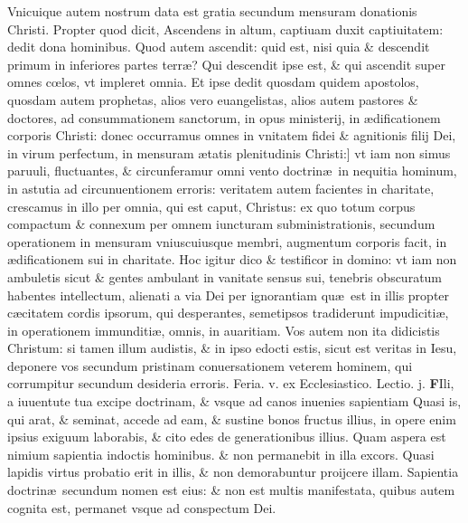 \documentclass[a5paper,10pt]{book}
\def\leftmarginnote{%
	\lrmarginnote{\hskip -\marginparsep \hskip -6.5em}}
\def\rightmarginnote{%
	\lrmarginnote{\hskip\columnwidth \hskip -1em}}
\def\ae{æ}
\def\oe{œ}
\begin{document}
\begin{multicols*}{2}
Vnicuique autem nostrum data est gratia secundum mensuram donationis Christi. Propter quod dicit, Ascendens in altum, captiuam duxit captiuitatem: dedit dona hominibus.
Quod autem ascendit: quid est, nisi quia \& descendit primum in inferiores partes terr\ae ? Qui descendit ipse est, \& qui ascendit super omnes c\oe los, vt impleret omnia.
Et ipse dedit quosdam quidem apostolos, quosdam autem prophetas, alios vero euangelistas, alios autem pastores \& doctores, ad consummationem sanctorum, in opus ministerij, in \ae dificationem corporis Christi: donec occurramus omnes in vnitatem fidei \& agnitionis filij Dei, in virum perfectum, in mensuram \ae tatis plenitudinis\leftmarginnote{\begin{flushright}C\end{flushright}} Christi:] vt iam non simus paruuli, fluctuantes, \& circunferamur omni vento doctrin\ae \ in nequitia hominum, in astutia ad circunuentionem erroris: veritatem autem facientes in charitate, crescamus in illo per omnia, qui est caput, Christus: ex quo totum corpus compactum \& connexum per omnem iuncturam subministrationis, secundum operationem in mensuram vniuscuiusque membri, augmentum corporis facit, in \ae dificationem sui in charitate.
Hoc igitur dico \&
testificor in domino: vt iam non ambuletis sicut \& gentes ambulant in vanitate sensus sui, tenebris obscuratum habentes intellectum, alienati a via Dei per ignorantiam qu\ae \ est in illis propter c\ae citatem cordis ipsorum, qui desperantes, semetipsos tradiderunt impudiciti\ae , in operationem immunditi\ae , omnis, in auaritiam.
Vos autem non ita didicistis Christum: si tamen illum audistis, \& in ipso edocti estis, sicut est veritas in Iesu, deponere vos secundum pristinam conuersationem veterem hominem, qui corrumpitur secundum desideria erroris.
\newline {} \color{red} \hypertarget{THU-SECVNDA-VAGAN}{Feria. v.} ex Ecclesiastico. Lectio. j. \color{black}
\vspace{-2.25em}
\lettrine[lines=2]{\bfseries F}{}Ili,\rightmarginnote{ca. 6.} a iuuentute tua excipe doctrinam, \& vsque ad canos inuenies sapientiam Quasi is, qui arat, \& seminat, accede ad eam, \& sustine bonos fructus illius, in opere enim ipsius exiguum laborabis, \& cito edes de generationibus illius.
Quam aspera est nimium sapientia indoctis hominibus. \& non permanebit in illa excors. Quasi lapidis virtus probatio erit in illis, \& non demorabuntur proijcere illam.
Sapientia doctrin\ae \ secundum nomen est eius: \& non est multis manifestata, quibus autem cognita est, permanet vsque ad conspectum Dei.

\end{multicols*}
\end{document}
